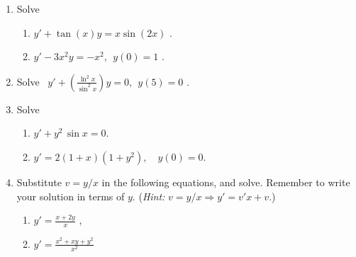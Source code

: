 \documentclass[a4paper,12pt,leqno]{article}
\begin{document}

\begin{enumerate}                    %

\item
Solve

\begin{enumerate}



\item   $ y' + \tan(x)y = x \sin(2x) $ .



\item	$ y'-3x^2 y = -x^2 , \ \ y(0)=1 $ .
\end{enumerate}


\item
Solve  \
 $ \displaystyle   y' + \left( \frac {\ln^{2}x} {\sin^{2}x} \right) y = 0 , \ \  y(5) = 0 $ .


\item
Solve
\begin{enumerate}
\item	$ y'+ y^2 \, \sin x = 0 $.


\item	$ y' = 2(1+x) (1 + y^2) ,  \quad  y(0)=0 $.
\end{enumerate}



\item
Substitute $v  = y/x$ in the following equations, and solve. Remember to write your solution in terms of $y.$ (\emph{Hint:} $v = y/x \Rightarrow y' = v'x +v$.)
\begin{enumerate}
\item	$ \displaystyle   y' = \frac {x+2y} {x} $ ,

\item	$ \displaystyle  y' = \frac {x^2 + xy + y^2} {x^2} $

\end{enumerate}












\end{enumerate}  %
\end{document}
